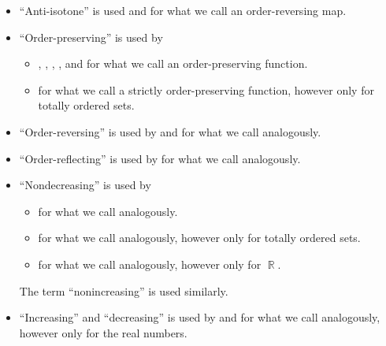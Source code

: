 \begin{remark}
\begin{itemize}
    \item \enquote{Anti-isotone} is used  and  for what we call an order-reversing map.

    \item \enquote{Order-preserving} is used by
    \begin{itemize}
       \item {}, , , ,  and  for what we call an order-preserving function.

       \item {} for what we call a strictly order-preserving function, however only for totally ordered sets.
    \end{itemize}

    \item \enquote{Order-reversing} is used by  and  for what we call analogously.

    \item \enquote{Order-reflecting} is used by  for what we call analogously.

    \item \enquote{Nondecreasing} is used by
    \begin{itemize}
      \item {} for what we call analogously.
      \item {} for what we call analogously, however only for totally ordered sets.
      \item {} for what we call analogously, however only for \( \BbbR \).
    \end{itemize}

    The term \enquote{nonincreasing} is used similarly.

    \item \enquote{Increasing} and \enquote{decreasing} is used by  and  for what we call analogously, however only for the real numbers.


\end{itemize}
\end{remark}

